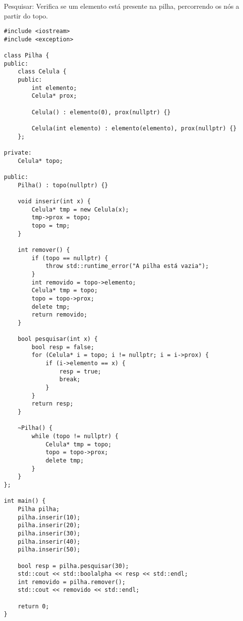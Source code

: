 \documentclass{article}
\begin{document}
Pesquisar: Verifica se um elemento está presente na pilha, percorrendo os nós a partir do topo.
\lstset{language=C++}
\begin{lstlisting}
#include <iostream>
#include <exception>

class Pilha {
public:
    class Celula {
    public:
        int elemento;
        Celula* prox;

        Celula() : elemento(0), prox(nullptr) {}

        Celula(int elemento) : elemento(elemento), prox(nullptr) {}
    };

private:
    Celula* topo;

public:
    Pilha() : topo(nullptr) {}

    void inserir(int x) {
        Celula* tmp = new Celula(x);
        tmp->prox = topo;
        topo = tmp;
    }

    int remover() {
        if (topo == nullptr) {
            throw std::runtime_error("A pilha está vazia");
        }
        int removido = topo->elemento;
        Celula* tmp = topo;
        topo = topo->prox;
        delete tmp;
        return removido;
    }

    bool pesquisar(int x) {
        bool resp = false;
        for (Celula* i = topo; i != nullptr; i = i->prox) {
            if (i->elemento == x) {
                resp = true;
                break;
            }
        }
        return resp;
    }

    ~Pilha() {
        while (topo != nullptr) {
            Celula* tmp = topo;
            topo = topo->prox;
            delete tmp;
        }
    }
};

int main() {
    Pilha pilha;
    pilha.inserir(10);
    pilha.inserir(20);
    pilha.inserir(30);
    pilha.inserir(40);
    pilha.inserir(50);

    bool resp = pilha.pesquisar(30);
    std::cout << std::boolalpha << resp << std::endl;
    int removido = pilha.remover();
    std::cout << removido << std::endl;

    return 0;
}
\end{lstlisting}
\end{document}
